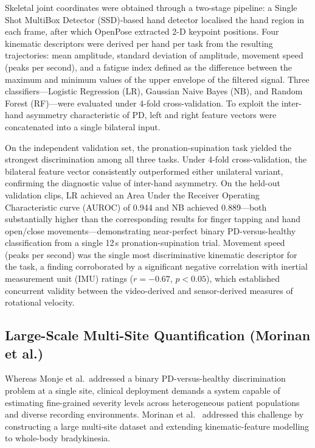 Skeletal joint coordinates were obtained through a two-stage pipeline: a Single Shot MultiBox Detector (SSD)-based hand detector localised the hand region in each frame, after which OpenPose extracted 2-D keypoint positions. Four kinematic descriptors were derived per hand per task from the resulting trajectories: mean amplitude, standard deviation of amplitude, movement speed (peaks per second), and a fatigue index defined as the difference between the maximum and minimum values of the upper envelope of the filtered signal. Three classifiers---Logistic Regression (LR), Gaussian Naive Bayes (NB), and Random Forest (RF)---were evaluated under 4-fold cross-validation. To exploit the inter-hand asymmetry characteristic of PD, left and right feature vectors were concatenated into a single bilateral input.

On the independent validation set, the pronation-supination task yielded the strongest discrimination among all three tasks. Under 4-fold cross-validation, the bilateral feature vector consistently outperformed either unilateral variant, confirming the diagnostic value of inter-hand asymmetry. On the held-out validation clips, LR achieved an Area Under the Receiver Operating Characteristic curve (AUROC) of 0.944 and NB achieved 0.889---both substantially higher than the corresponding results for finger tapping and hand open/close movements---demonstrating near-perfect binary PD-versus-healthy classification from a single 12\,s pronation-supination trial. Movement speed (peaks per second) was the single most discriminative kinematic descriptor for the task, a finding corroborated by a significant negative correlation with inertial measurement unit (IMU) ratings ($r = -0.67$, $p < 0.05$), which established concurrent validity between the video-derived and sensor-derived measures of rotational velocity.

\subsection{Large-Scale Multi-Site Quantification (Morinan et al.)}
\label{subsec:rw_morinan}

Whereas Monje et al.\ addressed a binary PD-versus-healthy discrimination problem at a single site, clinical deployment demands a system capable of estimating fine-grained severity levels across heterogeneous patient populations and diverse recording environments. Morinan et al.~\cite{morinan2023computer} addressed this challenge by constructing a large multi-site dataset and extending kinematic-feature modelling to whole-body bradykinesia.

